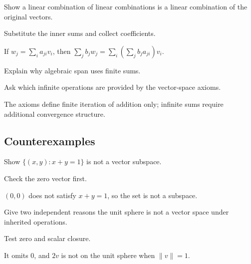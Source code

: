\begin{exercise}[Regrouping]\label{exr:i01-expand-08}
Show a linear combination of linear combinations is a linear combination of the original vectors.
\end{exercise}
\begin{hint}
Substitute the inner sums and collect coefficients.
\end{hint}
\begin{solution}
If \(w_j=\sum_i a_{ji}v_i\), then \(\sum_j b_jw_j=\sum_i(\sum_jb_ja_{ji})v_i\).
\end{solution}

\begin{exercise}\label{exr:i01-expand-09}
Explain why algebraic span uses finite sums.
\end{exercise}
\begin{hint}
Ask which infinite operations are provided by the vector-space axioms.
\end{hint}
\begin{solution}
The axioms define finite iteration of addition only; infinite sums require additional convergence structure.
\end{solution}

\subsection*{Counterexamples}

\begin{exercise}\label{exr:i01-expand-10}
Show \(\{(x,y):x+y=1\}\) is not a vector subspace.
\end{exercise}
\begin{hint}
Check the zero vector first.
\end{hint}
\begin{solution}
\((0,0)\) does not satisfy \(x+y=1\), so the set is not a subspace.
\end{solution}

\begin{exercise}\label{exr:i01-expand-11}
Give two independent reasons the unit sphere is not a vector space under inherited operations.
\end{exercise}
\begin{hint}
Test zero and scalar closure.
\end{hint}
\begin{solution}
It omits \(0\), and \(2v\) is not on the unit sphere when \(\|v\|=1\).
\end{solution}

